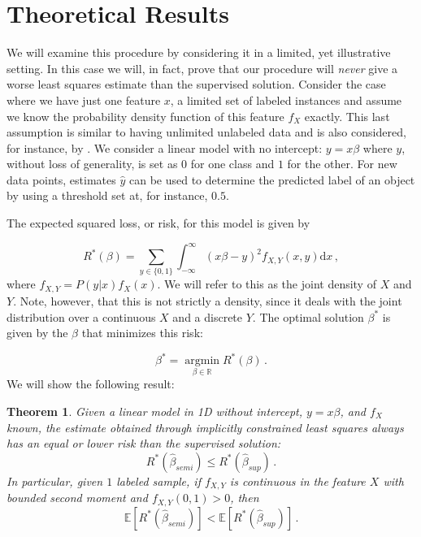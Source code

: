 \documentclass[twoside]{memoir}\usepackage[]{graphicx}\usepackage{xcolor}
\newtheorem{theorem}{Theorem}
\begin{document}
\section{Theoretical Results}
\label{section:theoreticalresults}
We will examine this procedure by considering it in a limited, yet illustrative setting. In this case we will, in fact, prove that our procedure will \emph{never} give a worse least squares estimate than the supervised solution.
Consider the case where we have just one feature $x$, a limited set of labeled instances and assume we know the probability density function of this feature $f_X$ exactly. 
This last assumption is similar to having unlimited unlabeled data and is also considered, for instance, by \citet{Sokolovska2008}. 
We consider a linear model with no intercept: $y = x \beta$ where $y$, without loss of generality, is set as $0$ for one class and $1$ for the other. 
For new data points, estimates $\hat{y}$ can be used to determine the predicted label of an object by using a threshold set at, for instance, $0.5$.

The expected squared loss, or risk, for this model is given by

\begin{equation} \label{eq:trueloss}
R^*(\beta) = \sum_{y \in \{0,1\}}{ \int_{-\infty}^{\infty}(x \beta - y)^2  f_{X,Y}(x,y)  \mathrm{d}x} \,,
\end{equation}
where $f_{X,Y}=P(y|x) f_X(x)$. We will refer to this as the joint density of $X$ and $Y$. Note, however, that this is not strictly a density, since it deals with the joint distribution over a continuous $X$ and a discrete $Y$. The optimal solution $\beta^\ast$ is given by the $\beta$ that minimizes this risk:

\begin{equation} \label{eq:bayesoptimal}
\beta^* = \operatorname*{argmin}_{\beta \in \mathbb{R}} R^*(\beta) \, .
\end{equation}
We will show the following result:
\begin{theorem}
\label{theorem:1d}
Given a linear model in 1D without intercept, $y = x\beta$, and $f_X$ known, the estimate obtained through implicitly constrained least squares always has an equal or lower risk than the supervised solution: $$R^\ast (\hat{\beta}_{semi}) \le R^\ast (\hat{\beta}_{sup}) \, .$$
In particular, given $1$ labeled sample, if $f_{X,Y}$ is continuous in the feature $X$ with bounded second moment and $f_{X,Y}(0,1) > 0$, then $$\mathbb{E}[R^*(\hat{\beta}_{semi})] < \mathbb{E}[R^*(\hat{\beta}_{sup})] \, .$$
\end{theorem}
\end{document}
